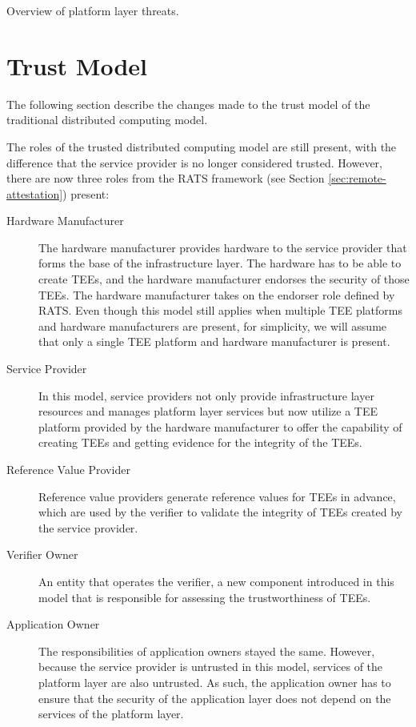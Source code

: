\begin{table}[H]
  \centering
  \scriptsize
  
  \caption{Overview of platform layer threats.}
\end{table}

\section{Trust Model}
\label{sec:trusted-trust-model}

The following section describe the changes made to the trust model of the
traditional distributed computing model.

The roles of the trusted distributed computing model are still present, with the
difference that the service provider is no longer considered trusted. However,
there are now three roles from the RATS framework (see Section
\ref{sec:remote-attestation}) present:

\begin{description}
  \item[Hardware Manufacturer]
    The hardware manufacturer provides hardware to the service provider that
    forms the base of the infrastructure layer. The hardware has to be able to
    create TEEs, and the hardware manufacturer endorses the security of those
    TEEs. The hardware manufacturer takes on the endorser role defined by RATS.
    Even though this model still applies when multiple TEE platforms and
    hardware manufacturers are present, for simplicity, we will assume that only
    a single TEE platform and hardware manufacturer is present.

  \item[Service Provider]
    In this model, service providers not only provide infrastructure layer
    resources and manages platform layer services but now utilize a TEE platform
    provided by the hardware manufacturer to offer the capability of creating
    TEEs and getting evidence for the integrity of the TEEs.

  \item[Reference Value Provider]
    Reference value providers generate reference values for TEEs in advance,
    which are used by the verifier to validate the integrity of TEEs created by
    the service provider.

  \item[Verifier Owner]
    An entity that operates the verifier, a new component introduced in this
    model that is responsible for assessing the trustworthiness of TEEs.

  \item[Application Owner]
    The responsibilities of application owners stayed the same. However, because
    the service provider is untrusted in this model, services of the platform
    layer are also untrusted. As such, the application owner has to ensure that
    the security of the application layer does not depend on the services of the
    platform layer.
\end{description}

